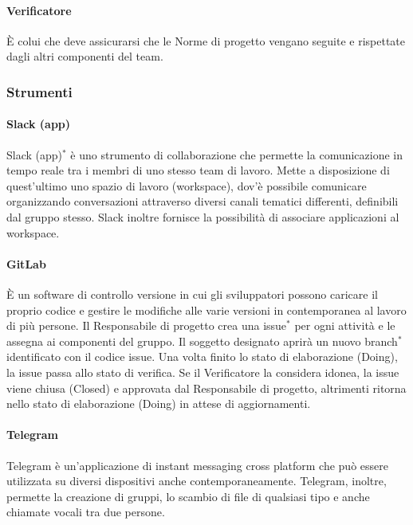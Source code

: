 \documentclass[11pt,a4paper]{article}
\begin{document}
{	\paragraph{Verificatore}
	È colui che deve assicurarsi che le Norme di progetto vengano seguite e rispettate dagli altri componenti del team.
	\subsubsection{Strumenti}
	
	\paragraph{Slack (app)\\}
	Slack (app)$^*$ è uno strumento di collaborazione che permette la comunicazione in tempo reale tra i membri di uno stesso team di lavoro. Mette a disposizione di quest’ultimo uno spazio di lavoro (workspace), dov'è possibile comunicare organizzando conversazioni attraverso diversi canali tematici differenti, definibili dal gruppo stesso.
	Slack inoltre fornisce la possibilità di associare applicazioni al workspace.
	
	\paragraph{GitLab\\}
	È un software di controllo versione in cui gli sviluppatori possono caricare il proprio codice e gestire le modifiche alle varie versioni in contemporanea al lavoro di più persone.
	Il Responsabile di progetto crea una issue$^*$ per ogni attività e le assegna ai componenti del gruppo. Il soggetto designato aprirà un nuovo branch$^*$ identificato con il codice issue.
	Una volta finito lo stato di elaborazione (Doing), la issue passa allo stato di verifica. Se il Verificatore la considera idonea, la issue viene chiusa (Closed) e approvata dal Responsabile di progetto, altrimenti ritorna nello stato di elaborazione (Doing) in attese di aggiornamenti.
	
	\paragraph{Telegram\\}

	Telegram è un'applicazione di instant messaging cross platform che può essere utilizzata su diversi dispositivi
	anche contemporaneamente. Telegram, inoltre, permette la creazione di gruppi, lo scambio di file di qualsiasi tipo
	e anche chiamate vocali tra due persone.
	
}
\end{document}
